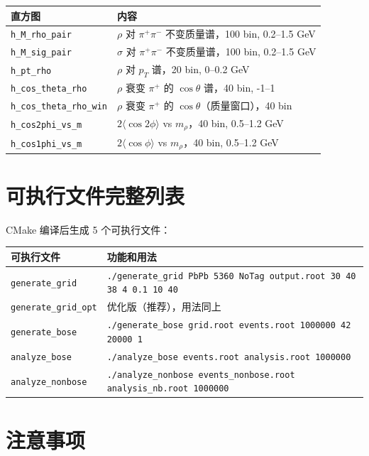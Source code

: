 \documentclass[11pt,a4paper,UTF8]{ctexart}
\begin{document}
\begin{longtable}{l p{9cm}}
\toprule
\textbf{直方图} & \textbf{内容} \\
\midrule
\texttt{h\_M\_rho\_pair} & $\rho$ 对 $\pi^+\pi^-$ 不变质量谱，100 bin, 0.2--1.5 GeV \\
\texttt{h\_M\_sig\_pair} & $\sigma$ 对 $\pi^+\pi^-$ 不变质量谱，100 bin, 0.2--1.5 GeV \\
\texttt{h\_pt\_rho} & $\rho$ 对 $p_T$ 谱，20 bin, 0--0.2 GeV \\
\texttt{h\_cos\_theta\_rho} & $\rho$ 衰变 $\pi^+$ 的 $\cos\theta$ 谱，40 bin, -1--1 \\
\texttt{h\_cos\_theta\_rho\_win} & $\rho$ 衰变 $\pi^+$ 的 $\cos\theta$（质量窗口），40 bin \\
\texttt{h\_cos2phi\_vs\_m} & $2\langle\cos 2\phi\rangle$ vs $m_\rho$，40 bin, 0.5--1.2 GeV \\
\texttt{h\_cos1phi\_vs\_m} & $2\langle\cos\phi\rangle$ vs $m_\rho$，40 bin, 0.5--1.2 GeV \\
\bottomrule
\end{longtable}

\section{可执行文件完整列表}

CMake 编译后生成 5 个可执行文件：

\begin{longtable}{l p{9cm}}
\toprule
\textbf{可执行文件} & \textbf{功能和用法} \\
\midrule
\texttt{generate\_grid} & \texttt{./generate\_grid PbPb 5360 NoTag output.root 30 40 38 4 0.1 10 40} \\
\texttt{generate\_grid\_opt} & 优化版（推荐），用法同上 \\
\texttt{generate\_bose} & \texttt{./generate\_bose grid.root events.root 1000000 42 20000 1} \\
\texttt{analyze\_bose} & \texttt{./analyze\_bose events.root analysis.root 1000000} \\
\texttt{analyze\_nonbose} & \texttt{./analyze\_nonbose events\_nonbose.root analysis\_nb.root 1000000} \\
\bottomrule
\end{longtable}

\section{注意事项}
\end{document}
